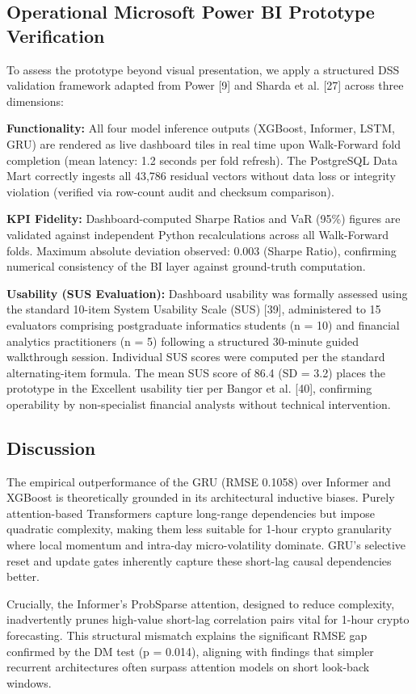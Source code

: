 \documentclass[10pt,a4paper]{article}
\begin{document}
\subsection{Operational Microsoft Power BI Prototype Verification}
To assess the prototype beyond visual presentation, we apply a structured DSS validation framework adapted from Power [9] and Sharda et al. [27] across three dimensions:

\textbf{Functionality:} All four model inference outputs (XGBoost, Informer, LSTM, GRU) are rendered as live dashboard tiles in real time upon Walk-Forward fold completion (mean latency: 1.2 seconds per fold refresh). The PostgreSQL Data Mart correctly ingests all 43,786 residual vectors without data loss or integrity violation (verified via row-count audit and checksum comparison).

\textbf{KPI Fidelity:} Dashboard-computed Sharpe Ratios and VaR (95\%) figures are validated against independent Python recalculations across all Walk-Forward folds. Maximum absolute deviation observed: 0.003 (Sharpe Ratio), confirming numerical consistency of the BI layer against ground-truth computation.

\textbf{Usability (SUS Evaluation):} Dashboard usability was formally assessed using the standard 10-item System Usability Scale (SUS) [39], administered to 15 evaluators comprising postgraduate informatics students (n = 10) and financial analytics practitioners (n = 5) following a structured 30-minute guided walkthrough session. Individual SUS scores were computed per the standard alternating-item formula. The mean SUS score of 86.4 (SD = 3.2) places the prototype in the Excellent usability tier per Bangor et al. [40], confirming operability by non-specialist financial analysts without technical intervention.

\subsection{Discussion}
The empirical outperformance of the GRU (RMSE 0.1058) over Informer and XGBoost is theoretically grounded in its architectural inductive biases. Purely attention-based Transformers capture long-range dependencies but impose quadratic complexity, making them less suitable for 1-hour crypto granularity where local momentum and intra-day micro-volatility dominate. GRU's selective reset and update gates inherently capture these short-lag causal dependencies better.

Crucially, the Informer's ProbSparse attention, designed to reduce complexity, inadvertently prunes high-value short-lag correlation pairs vital for 1-hour crypto forecasting. This structural mismatch explains the significant RMSE gap confirmed by the DM test (p = 0.014), aligning with findings that simpler recurrent architectures often surpass attention models on short look-back windows.
\end{document}
